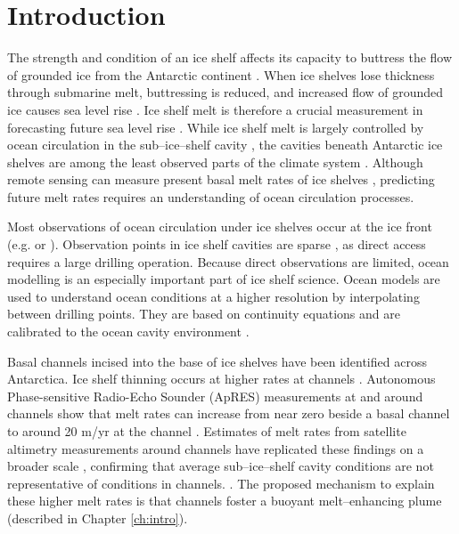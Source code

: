 
\section{Introduction}

The strength and condition of an ice shelf affects its capacity to buttress the flow of grounded ice from the Antarctic continent \citep{gagliardini2010coupling}. When ice shelves lose thickness through submarine melt, buttressing is reduced, and increased flow of grounded ice causes sea level rise \citep{pritchard2012antarctic}.
Ice shelf melt is therefore a crucial measurement in forecasting future sea level rise \citep{liu2015ocean,scambos2017much}.  While ice shelf melt is largely controlled by ocean circulation in the sub--ice--shelf cavity \citep{rignot2013ice}, the cavities beneath Antarctic ice shelves are among the least observed parts of the climate system \citep{stevens2020ocean}. Although remote sensing can measure present basal melt rates of ice shelves \citep[e.g][]{rignot2013ice,mankoff2012role,goldberg2019accurately}, predicting future melt rates requires an understanding of ocean circulation processes. 

Most observations of ocean circulation under ice shelves occur at the ice front 
(e.g. \cite{arzeno2014ocean} or \cite{smethie2005circulation}). Observation points in ice shelf cavities are sparse \citep[e.g.][]{begeman2018ocean,stevens2020ocean,foster1983temperature}, as direct access requires a large drilling operation. 
Because direct observations are limited, ocean modelling is an especially important part of ice shelf science. Ocean models are used to understand ocean conditions at a higher resolution by interpolating between drilling points.  They are based on continuity equations and are calibrated to the ocean cavity environment \citep[e.g.][]{millgate2013effect, holland2003modelling}.


Basal channels incised into the base of ice shelves have been identified across Antarctica. Ice shelf thinning occurs at higher rates at channels  \citep[e.g.][]{marsh2016high}. Autonomous Phase-sensitive Radio-Echo Sounder (ApRES) measurements at and around channels show that melt rates can increase from near zero beside a basal channel to around 20 m/yr at the channel \citep{stanton2013channelized, marsh2016high}. Estimates of melt rates from satellite altimetry measurements around channels have replicated these findings on a broader scale \cite[e.g][]{chartrand2020basal,rignot2008channelized},
confirming that average sub--ice--shelf cavity conditions are not representative of conditions in channels. \citep{le2009subglacial,alley2016impacts}. The proposed mechanism to explain these higher melt rates is that channels foster a buoyant melt--enhancing plume (described in Chapter \ref{ch:intro}). 


